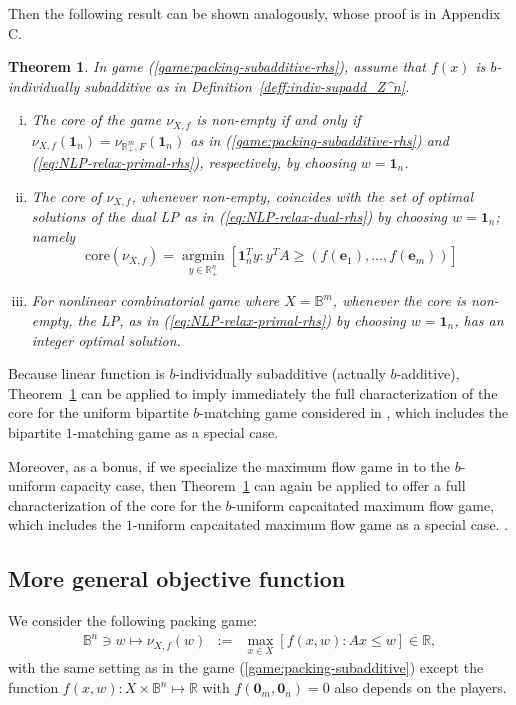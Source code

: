 \documentclass[11pt]{article}\usepackage[]{graphicx}\usepackage[]{xcolor}
\newtheorem{thm}{Theorem}
\DeclareMathOperator*{\argmin}{argmin}
\begin{document}
Then the following result can be shown analogously, whose proof is in Appendix C. 
\begin{thm}\label{thm:nonlinear-packing-rhs-arb}
In game (\ref{game:packing-subadditive-rhs}), assume that $f(x)$ is $b$-individually subadditive as in Definition~\ref{deff:indiv-supadd_Z^n}. 
\begin{enumerate}[(i)]
\item The core of the game $\nu_{X, f}$ is non-empty if and only if $\nu_{X, f}\left(\mathbf{1}_n\right)=\nu_{\mathbb{R}^m_{+}, F}\left(\mathbf{1}_n\right)$ as in (\ref{game:packing-subadditive-rhs}) and (\ref{eq:NLP-relax-primal-rhs}), respectively, by choosing $w=\mathbf{1}_n$.
\item The core of $\nu_{X, f}$, whenever non-empty, coincides with the set of optimal solutions of the dual LP as in (\ref{eq:NLP-relax-dual-rhs}) by choosing $w=\mathbf{1}_n$; namely
 \[
 \text{core} \left(\nu_{X, f}\right)=\argmin\limits_{y\in \mathbb{R}^n_{+}} \left[\mathbf{1}_n^Ty: y^TA\ge (f(\mathbf{e}_1),\dots, f(\mathbf{e}_m))\right]
 \]
\item For nonlinear combinatorial game where $X=\mathbb{B}^m$, whenever the core is non-empty, the LP, as in (\ref{eq:NLP-relax-primal-rhs}) by choosing $w=\mathbf{1}_n$, has an integer optimal solution. 
\end{enumerate}
\end{thm}


Because linear function is $b$-individually subadditive (actually $b$-additive), Theorem~\ref{thm:nonlinear-packing-rhs-arb} can be applied to imply immediately the full characterization of the core for the uniform bipartite $b$-matching game considered in \citep[Theorem 9]{vazirani2023lp}, which includes the bipartite $1$-matching game \citep[Theorem 3]{deng1999algorithmic} as a special case. 

Moreover, as a bonus, if we specialize the maximum flow game in \citep[Section 8]{vazirani2023lp} to the $b$-uniform capacity case, then Theorem~\ref{thm:nonlinear-packing-rhs-arb} can again be applied to offer a full characterization of the core for the $b$-uniform capcaitated maximum flow game, which includes the $1$-uniform capcaitated maximum flow game \citep[Section 3.1]{deng1999algorithmic} as a special case. . 


\subsection{More general objective function}\label{subsec:general-obj}
We consider the following packing game:
\begin{eqnarray}\label{game:packing-subadditive-obj}
 \mathbb{B}^n\ni w\mapsto \nu_{X, f}(w)&:=&\max\limits_{x\in X}\left[f(x, w): Ax\le w\right]\in \mathbb{R},
\end{eqnarray}
with the same setting as in the game (\ref{game:packing-subadditive}) except the function $f(x, w): X\times \mathbb{B}^n\mapsto\mathbb{R}$ with $f(\mathbf{0}_m, \mathbf{0}_n)=0$ also depends on the players. 
\end{document}
